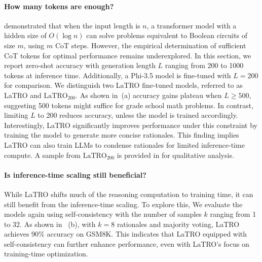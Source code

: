 \paragraph{How many tokens are enough?} \citet{DBLP:conf/iclr/0001LZ024} demonstrated that when the input length is $n$, a transformer model with a hidden size of $O(\log n)$ can solve problems equivalent to Boolean circuits of size $m$, using $m$ CoT steps. However, the empirical determination of sufficient CoT tokens for optimal performance remains underexplored. In this section, we report zero-shot accuracy with generation length $L$ ranging from 200 to 1000 tokens at inference time. Additionally, a Phi-3.5 model is fine-tuned with $L=200$ for comparison. We distinguish two LaTRO fine-tuned models, referred to as LaTRO and $\text{LaTRO}_{200}$. As shown in~(a) accuracy gains plateau when $L\geq 500$, suggesting 500 tokens might suffice for grade school math problems. In contrast, limiting $L$ to 200 reduces accuracy, unless the model is trained accordingly. Interestingly, LaTRO significantly improves performance under this constraint by training the model to generate more concise rationales. This finding implies LaTRO can also train LLMs to condense rationales for limited inference-time compute. A sample from $\text{LaTRO}_{200}$ is provided in  for qualitative analysis.

\paragraph{Is inference-time scaling still beneficial?} While LaTRO shifts much of the reasoning computation to training time, it can still benefit from the inference-time scaling. To explore this, We evaluate the models again using self-consistency with the number of samples $k$ ranging from 1 to 32. As shown in~ (b), with $k=8$ rationales and majority voting, LaTRO achieves 90\% accuracy on GSM8K. This indicates that LaTRO equipped with self-consistency can further enhance performance, even with LaTRO's focus on training-time optimization.



